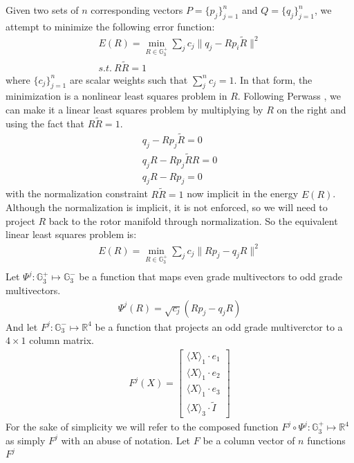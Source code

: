 \documentclass{birkjour}
\numberwithin{equation}{section}
\begin{document}
Given two sets of $n$ corresponding vectors $P = \{p_j\}_{j=1}^n$ and $Q = \{q_j\}_{j=1}^n$, we attempt to minimize the following error function:
\begin{eqnarray*}
E(R) = \min_{R \in \mathbb{G}^{+}_3 } \sum_j { c_{j} \|q_j - R p_i \tilde R\|^2 }\\
s.t. \ R \tilde R = 1
\end{eqnarray*}
where $\{c_{j}\}_{j=1}^n$ are scalar weights such that $\sum_j^n{c_j} = 1$. In that form, the minimization is a nonlinear least squares problem in $R$. Following Perwass \cite{Perwass2009}, we can make it a linear least squares problem by multiplying by $R$ on the right and using the fact that $R \tilde R = 1$.
\begin{eqnarray*}
q_j - R p_j \tilde R = 0\\
q_j R - R p_j \tilde R R = 0\\
q_j R - R p_j = 0
\end{eqnarray*}
with the normalization constraint $R \tilde R = 1$ now implicit in the energy $E(R)$. Although the normalization is implicit, it is not enforced, so we will need to project $R$ back to the rotor manifold through normalization. So the equivalent linear least squares problem is:
\begin{eqnarray*}
E(R) = \min_{R \in \mathbb{G}^{+}_3 } \sum_j { c_{j} \|R p_j - q_j R\|^2 }\\
\end{eqnarray*}
Let $\Psi^j : \mathbb{G}^{+}_3 \mapsto \mathbb{G}^{-}_3$ be a function that maps even grade multivectors to odd grade multivectors. 
\begin{eqnarray*}
\Psi^j(R) = \sqrt{c_{j}} (R p_j - q_j R)
\end{eqnarray*}
And let $F^j : \mathbb{G}^{-}_3 \mapsto \mathbb{R}^4$ be a function that projects an odd grade multiverctor to a $4\times1$ column matrix.
\begin{eqnarray*}
F^j(X) = \left[\begin{array}{c} \langle X \rangle_1 \cdot e_1 \\ \langle X \rangle_1 \cdot e_2 \\ \langle X \rangle_1 \cdot e_3 \\ \langle X \rangle_3 \cdot \tilde I \end{array}\right]
\end{eqnarray*}
For the sake of simplicity we will refer to the composed function $F^j \circ \Psi^j:\mathbb{G}^{+}_3 \mapsto \mathbb{R}^4$ as simply $F^j$ with an abuse of notation.
Let $F$ be a column vector of $n$ functions $F^j$
\end{document}
